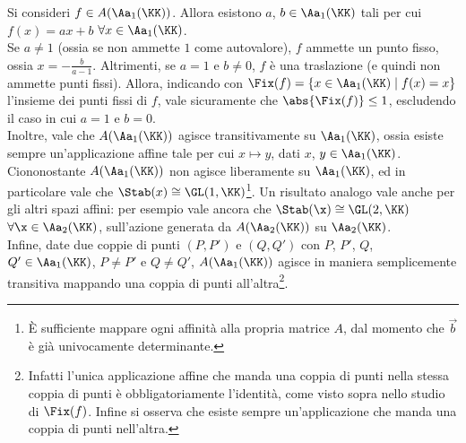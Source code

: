 \documentclass[11pt]{article}
\begin{document}
	\begin{example}
		Si consideri $f \in A(\Aa_1(\KK))$. Allora esistono $a$, $b \in \Aa_1(\KK)$ tali per cui $f(x) = ax+b$ $\forall x \in \Aa_1(\KK)$. \\
		
		Se $a \neq 1$ (ossia se non ammette $1$ come autovalore), $f$ ammette un punto fisso, ossia
		$x = -\frac{b}{a-1}$. Altrimenti, se $a = 1$ e $b \neq 0$, $f$ è una traslazione (e quindi non ammette punti fissi).
		Allora, indicando con $\Fix(f) = \{ x \in \Aa_1(\KK) \mid f(x) = x \}$ l'insieme dei punti fissi
		di $f$, vale sicuramente che $\abs{\Fix(f)} \leq 1$, escludendo il caso in cui $a = 1$ e $b = 0$. \\
		
		Inoltre, vale che $A(\Aa_1(\KK))$ agisce transitivamente su $\Aa_1(\KK)$, ossia esiste sempre un'applicazione
		affine tale per cui $x \mapsto y$, dati $x$, $y \in \Aa_1(\KK)$. Ciononostante $A(\Aa_1(\KK))$ non agisce
		liberamente su $\Aa_1(\KK)$, ed in particolare vale che $\Stab(x) \cong \GL(1, \KK)$\footnote{È sufficiente
		mappare ogni affinità alla propria matrice $A$, dal momento che $\vec b$ è già univocamente determinante.}.
		Un risultato analogo vale anche per gli altri spazi affini: per esempio vale ancora che
		$\Stab(\x) \cong \GL(2, \KK)$ $\forall \x \in \Aa_2(\KK)$, sull'azione generata da $A(\Aa_2(\KK))$ su $\Aa_2(\KK)$. \\
		
		Infine, date due coppie di punti $(P, P')$ e $(Q, Q')$ con $P$, $P'$, $Q$, $Q' \in \Aa_1(\KK)$,
		$P \neq P'$ e $Q \neq Q'$, $A(\Aa_1(\KK))$ agisce in maniera semplicemente transitiva mappando una coppia
		di punti all'altra\footnote{Infatti l'unica applicazione affine che manda una coppia di punti nella stessa coppia di punti è obbligatoriamente l'identità, come visto sopra nello studio di $\Fix(f)$. Infine si osserva che esiste sempre un'applicazione che manda una coppia di punti nell'altra.}.
	\end{example}
	
\end{document}
